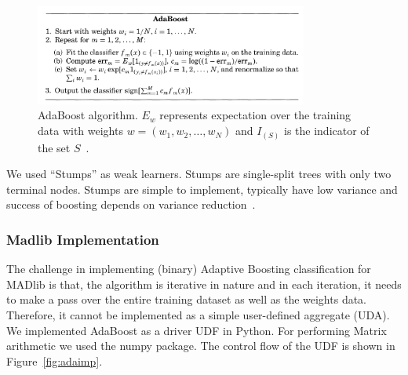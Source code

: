 \begin{figure}[ht]
\centering
\includegraphics[width=0.8\textwidth]{ada.png}
\caption{AdaBoost algorithm. $E_w$ represents expectation over the training data with weights $w=(w_1,w_2,\ldots,w_N)$ and $I_{(S)}$ is the indicator of the set $S$~\cite{alr00}.}
\label{fig:adaproc}
\end{figure}

We used ``Stumps'' as weak learners. Stumps are single-split trees with only two terminal nodes. Stumps are simple to implement, typically have low variance and success of boosting depends on variance reduction~\cite{alr00}.

\subsubsection{Madlib Implementation}
The challenge in implementing (binary) Adaptive Boosting classification for MADlib is that, the algorithm is iterative in nature and in each iteration, it needs to make a pass over the entire training dataset as well as the weights data. Therefore, it cannot be implemented as a simple user-defined aggregate (UDA). We implemented AdaBoost as a driver UDF in Python. For performing Matrix arithmetic we used the {\ttfamily numpy} package. The control flow of the UDF is shown in Figure~\ref{fig:adaimp}.

